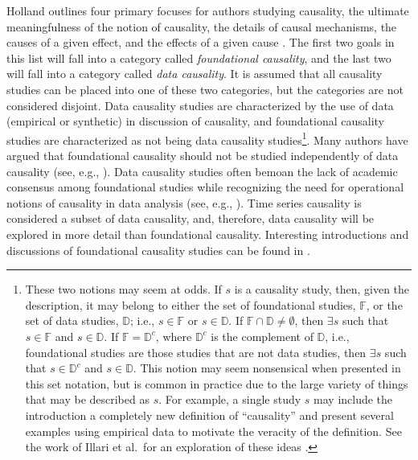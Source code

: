 \documentclass{article}[10pt]
\begin{document}
Holland outlines four primary focuses for authors studying causality, the ultimate meaningfulness of the notion of causality, the details of causal mechanisms, the causes of a given effect, and the effects of a given cause \cite{Holland1986}.  The first two goals in this list will fall into a category called {\em foundational causality}, and the last two will fall into a category called {\em data causality}.  It is assumed that all causality studies can be placed into one of these two categories, but the categories are not considered disjoint.  Data causality studies are characterized by the use of data (empirical or synthetic) in discussion of causality, and foundational causality studies are characterized as not being data causality studies\footnote{These two notions may seem at odds.  If $s$ is a causality study, then, given the description, it may belong to either the set of foundational studies, $\mathbb{F}$, or the set of data studies, $\mathbb{D}$; i.e., $s\in\mathbb{F}$ or $s\in\mathbb{D}$.  If $\mathbb{F}\cap\mathbb{D}\neq\emptyset$, then $\exists s$ such that $s\in\mathbb{F}$ and $s\in\mathbb{D}$.  If $\mathbb{F}=\mathbb{D}^c$, where $\mathbb{D}^c$ is the complement of $\mathbb{D}$, i.e., foundational studies are those studies that are not data studies, then $\exists s$ such that $s\in\mathbb{D}^c$ and $s\in\mathbb{D}$.  This notion may seem nonsensical when presented in this set notation, but is common in practice due to the large variety of things that may be described as $s$.  For example, a single study $s$ may include the introduction a completely new definition of ``causality'' and present several examples using empirical data to motivate the veracity of the definition.  See the work of Illari et al.\ for an exploration of these ideas \cite{Illari2014,Illari2011b}.}.  Many authors have argued that foundational causality should not be studied independently of data causality (see, e.g., \cite{Holland1986,Granger2003,Plotnitsky2011,Zellner2007,Zellner1979,Zellner1988,Bohm1971}).  Data causality studies often bemoan the lack of academic consensus among foundational studies while recognizing the need for operational notions of causality in data analysis (see, e.g., \cite{Shugan2007,Granger1980,Zheng2010,Pearl2000,Druzdzel1993}).  Time series causality is considered a subset of data causality, and, therefore, data causality will be explored in more detail than foundational causality.  Interesting introductions and discussions of foundational causality studies can be found in \cite{Pearl2000,Illari2014,Kleinberg2012,Bunge1979,Bohm1971,Imbens2015}.  
\end{document}
